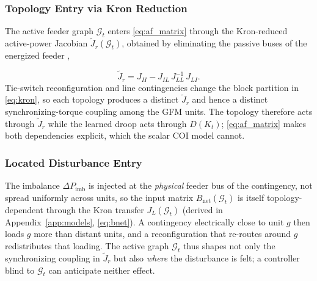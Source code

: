 \documentclass[lettersize,journal]{IEEEtran}
\begin{document}
\subsubsection{Topology Entry via Kron Reduction}
The active feeder graph $\mathcal{G}_t$ enters \eqref{eq:af_matrix} through the Kron-reduced active-power Jacobian $\tilde{J}_r(\mathcal{G}_t)$, obtained by eliminating the passive buses of the energized feeder \cite{luo2014kronmicrogrid,ajala2023gfmreduction,abdolmaleki2020onlinekron},

\begin{equation}
  \tilde{J}_r = J_{II}-J_{IL}\,J_{LL}^{-1}\,J_{LI}.
  \label{eq:kron}
\end{equation}
Tie-switch reconfiguration and line contingencies change the block partition in \eqref{eq:kron}, so each topology produces a distinct $\tilde{J}_r$ and hence a distinct synchronizing-torque coupling among the GFM units. The topology therefore acts through $\tilde{J}_r$ while the learned droop acts through $D(K_t)$; \eqref{eq:af_matrix} makes both dependencies explicit, which the scalar COI model cannot.

\subsubsection{Located Disturbance Entry}
The imbalance $\Delta P_{\mathrm{imb}}$ is injected at the \emph{physical} feeder bus of the contingency, not spread uniformly across units, so the input matrix $B_{\mathrm{net}}(\mathcal{G}_t)$ is itself topology-dependent through the Kron transfer $J_L(\mathcal{G}_t)$ (derived in Appendix~\ref{app:models}, \eqref{eq:bnet}). A contingency electrically close to unit $g$ then loads $g$ more than distant units, and a reconfiguration that re-routes around $g$ redistributes that loading. The active graph $\mathcal{G}_t$ thus shapes not only the synchronizing coupling in $\tilde{J}_r$ but also \emph{where} the disturbance is felt; a controller blind to $\mathcal{G}_t$ can anticipate neither effect.
\end{document}
